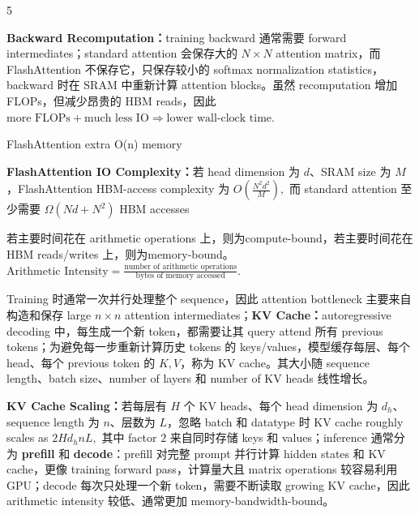 \documentclass[a4paper, landscape]{article}
\begin{document}
\begin{multicols}{5}
\par \textbf{Backward Recomputation：}training backward 通常需要 forward intermediates；standard attention 会保存大的 \(N\times N\) attention matrix，而 FlashAttention 不保存它，只保存较小的 softmax normalization statistics，backward 时在 SRAM 中重新计算 attention blocks。虽然 recomputation 增加 FLOPs，但减少昂贵的 HBM reads，因此
\(
\text{more FLOPs}+\text{much less IO}
\Rightarrow
\text{lower wall-clock time}.
\)

FlashAttention extra O(n) memory

\par \textbf{FlashAttention IO Complexity：}若 head dimension 为 \(d\)、SRAM size 为 \(M\)，FlashAttention HBM-access complexity 为
\(
O\!\left(\frac{N^2d^2}{M}\right),
\)
而 standard attention 至少需要
\(
\Omega(Nd+N^2)
\)
HBM accesses

若主要时间花在 arithmetic operations 上，则为compute-bound，若主要时间花在 HBM reads/writes 上，则为memory-bound。
\(
\text{Arithmetic Intensity}
=
\frac{\text{number of arithmetic operations}}{\text{bytes of memory accessed}}.
\)

\par Training 时通常一次并行处理整个 sequence，因此 attention bottleneck 主要来自构造和保存 large \(n\times n\) attention intermediates；\textbf{KV Cache：}autoregressive decoding 中，每生成一个新 token，都需要让其 query attend 所有 previous tokens；为避免每一步重新计算历史 tokens 的 keys/values，模型缓存每层、每个 head、每个 previous token 的 \(K,V\)，称为 KV cache。其大小随 sequence length、batch size、number of layers 和 number of KV heads 线性增长。

\par \textbf{KV Cache Scaling：}若每层有 \(H\) 个 KV heads、每个 head dimension 为 \(d_h\)、sequence length 为 \(n\)、层数为 \(L\)，忽略 batch 和 datatype 时 KV cache roughly scales as
\(
2H d_h nL,
\)
其中 factor \(2\) 来自同时存储 keys 和 values；inference 通常分为 \textbf{prefill} 和 \textbf{decode}：prefill 对完整 prompt 并行计算 hidden states 和 KV cache，更像 training forward pass，计算量大且 matrix operations 较容易利用 GPU；decode 每次只处理一个新 token，需要不断读取 growing KV cache，因此 arithmetic intensity 较低、通常更加 memory-bandwidth-bound。


\end{multicols}
\end{document}
